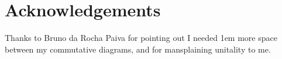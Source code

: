 \chapter{Acknowledgements}\label{chap:acknowledgements}

Thanks to Bruno da Rocha Paiva for pointing out I needed 1em more space between
my commutative diagrams, and for mansplaining unitality to me.

